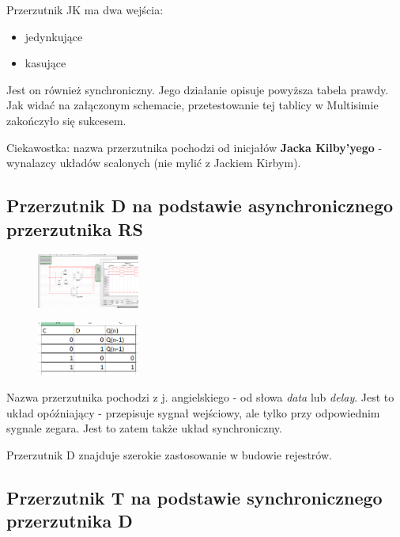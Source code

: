 \documentclass[12pt,a4paper]{article}
\begin{document}
Przerzutnik JK ma dwa wejścia:
\begin{itemize}
\item jedynkujące
\item kasujące
\end{itemize}

Jest on również synchroniczny. Jego działanie opisuje  powyższa tabela prawdy. Jak widać na załączonym schemacie, przetestowanie tej tablicy w Multisimie zakończyło się sukcesem.


Ciekawostka: nazwa przerzutnika pochodzi od inicjałów  \textbf{Jacka Kilby'yego} - wynalazcy układów scalonych (nie mylić z Jackiem Kirbym).


\subsection{Przerzutnik D na podstawie asynchronicznego przerzutnika RS}
\begin{figure}[H]
\centering
\includegraphics[width=0.3\textwidth]{img/3d}
\end{figure}
\begin{figure}[H]
\centering
\includegraphics[width=0.3\textwidth]{img/3dTruthTable}
\end{figure}

Nazwa przerzutnika pochodzi z j. angielskiego - od słowa \textit{data} lub \textit{delay}. Jest to układ opóźniający - przepisuje sygnał wejściowy, ale tylko przy odpowiednim sygnale zegara. Jest to zatem także układ synchroniczny.

Przerzutnik D znajduje szerokie zastosowanie w budowie rejestrów.

\subsection{Przerzutnik T na podstawie synchronicznego przerzutnika D}
\end{document}
